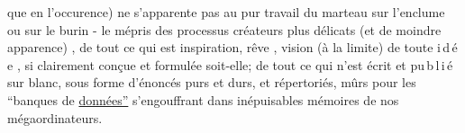 
que en l'occurence) ne s'apparente pas au pur travail du marteau sur l'enclume ou sur le burin - le mépris des processus créateurs  plus délicats (et  de moindre apparence) ,  de tout ce qui est  inspiration, rêve , vision    (à la limite) de toute \mbox{i\,d\,é\,e} , si clairement conçue et formulée soit-elle; de tout ce qui n'est écrit et \mbox{pu\,b\,l\,i\,é}  sur blanc, sous forme d'énoncés purs et durs,   et répertoriés, mûrs pour les ``banques de \uline{données''} s'engouffrant dans  inépuisables mémoires de nos mégaordinateurs.

